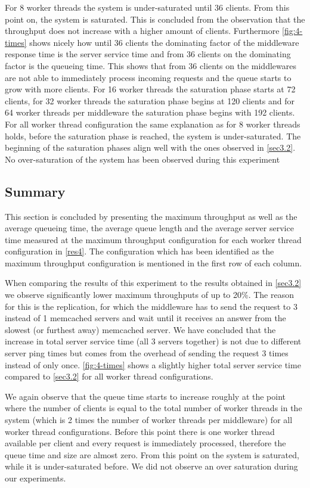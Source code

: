 \documentclass[11pt,a4paper]{article}
\begin{document}
For 8 worker threads the system is under-saturated until 36 clients. From this point on, the system is saturated. This is concluded from the observation that the throughput does not increase with a higher amount of clients. Furthermore \autoref{fig:4-times} shows nicely how until 36 clients the dominating factor of the middleware response time is the server service time and from 36 clients on the dominating factor is the queueing time. This shows that from 36 clients on the middlewares are not able to immediately process incoming requests and the queue starts to grow with more clients.
For 16 worker threads the saturation phase starts at 72 clients, for 32 worker threads the saturation phase begins at 120 clients and for 64 worker threads per middleware the saturation phase begins with 192 clients. For all worker thread configuration the same explanation as for 8 worker threads holds, before the saturation phase is reached, the system is under-saturated. The beginning of the saturation phases align well with the ones observed in \autoref{sec3.2}.
No over-saturation of the system has been observed during this experiment

\subsection{Summary}
This section is concluded by presenting the maximum throughput as well as the average queueing time, the average queue length and the average server service time measured at the maximum throughput configuration for each worker thread configuration in \autoref{res4}. The configuration which has been identified as the maximum throughput configuration is mentioned in the first row of each column.

When comparing the results of this experiment to the results obtained in \autoref{sec3.2} we observe significantly lower maximum throughputs of up to 20\%. The reason for this is the replication, for which the middleware has to send the request to 3 instead of 1 memcached servers and wait until it receives an answer from the slowest (or furthest away) memcached server. We have concluded that the increase in total server service time (all 3 servers together) is not due to different server ping times but comes from the overhead of sending the request 3 times instead of only once. \autoref{fig:4-times} shows a slightly higher total server service time compared to \autoref{sec3.2} for all worker thread configurations.

We again observe that the queue time starts to increase roughly at the point where the number of clients is equal to the total number of worker threads in the system (which is 2 times the number of worker threads per middleware) for all worker thread configurations. Before this point there is one worker thread available per client and every request is immediately processed, therefore the queue time and size are almost zero. From this point on the system is saturated, while it is under-saturated before. We did not observe an over saturation during our experiments.
\end{document}

